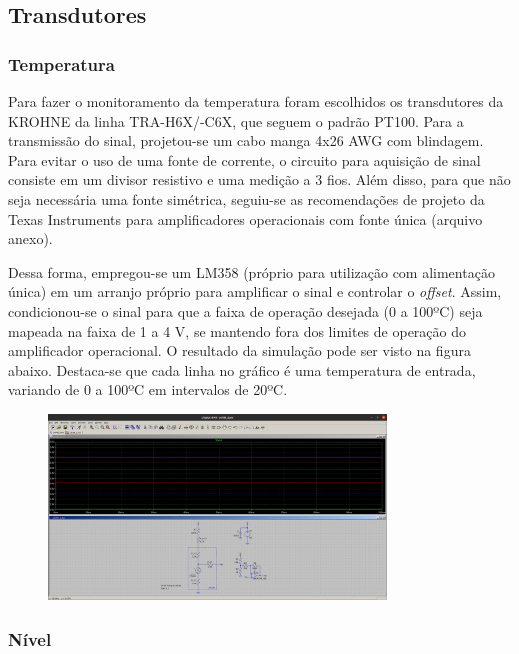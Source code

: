 \documentclass[a4paper]{report}
\begin{document}
\subsection*{Transdutores}

\subsubsection*{Temperatura}

Para fazer o monitoramento da temperatura foram escolhidos os transdutores da KROHNE da linha TRA-H6X/-C6X, que seguem o padrão PT100. Para a transmissão do sinal, projetou-se um cabo manga 4x26 AWG com blindagem. Para evitar o uso de uma fonte de corrente, o circuito para aquisição de sinal consiste em um divisor resistivo e uma medição a 3 fios. Além disso, para que não seja necessária uma fonte simétrica, seguiu-se as recomendações de projeto da Texas Instruments para amplificadores operacionais com fonte única (arquivo anexo).

Dessa forma, empregou-se um LM358 (próprio para utilização com alimentação única) em um arranjo próprio para amplificar o sinal e controlar o \emph{offset}. Assim, condicionou-se o sinal para que a faixa de operação desejada (0 a 100ºC) seja mapeada na faixa de 1 a 4 V, se mantendo fora dos limites de operação do amplificador operacional. O resultado da simulação pode ser visto na figura abaixo. Destaca-se que cada linha no gráfico é uma temperatura de entrada, variando de 0 a 100ºC em intervalos de 20ºC.

\begin{figure}[H]
    \centering
    \includegraphics[width=0.8\textwidth]{figures/sym_pt100.png}
\end{figure}

\subsubsection*{Nível}
\end{document}

